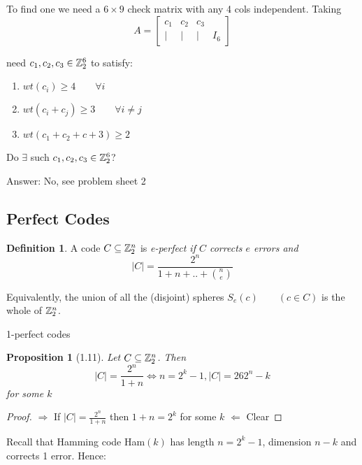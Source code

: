 \documentclass[]{article}
\newtheorem{prop}[thm]{Proposition}
\theoremstyle{definition}
\newtheorem*{defn}{Definition}
\theoremstyle{remark}
\numberwithin{equation}{section}
\begin{document}
			To find one we need a $6 \times 9$ check matrix with any 4 cols independent. \newline
			Taking \[
				A = \begin{bmatrix}
					c_1 & c_2 & c_3 \\
					| & | & | & I_6

				\end{bmatrix}
			\]

			need $c_1, c_2, c_3 \in \mathbb{Z}_2^6$ to satisfy: \newline

			\begin{enumerate}
				\item $wt(c_i)\geq 4 \qquad \forall i$
				\item $wt(c_i + c_j) \geq 3 \qquad \forall i\neq j$
				\item $wt(c_1 + c_2 + c+3) \geq 2$
			\end{enumerate}

			Do $\exists$ such $c_1, c_2, c_3 \in \mathbb{Z}_2^6$?

			Answer: No, see problem sheet 2
	\subsection{Perfect Codes}
		\begin{defn}
			A code $C \subseteq \mathbb{Z}_2^n$ is  \em{e-perfect} if $C$ corrects $e$ errors and \newline
			\[
			|C| = \frac{2^n}{1 + n + .. + \binom{n}{e}}
			\]

			Equivalently, the union of all the (disjoint) spheres $S_e(c)\qquad (c\in C)$ is the whole of $\mathbb{Z}_2^n$.
		\end{defn}

		1-perfect codes

		\begin{prop}[1.11]
			Let $C \subseteq \mathbb{Z}_2^n$. Then \newline
			\[
				|C| = \frac{2^n}{1+n} \iff n=2^k-1, |C| =26 2^n-k
			\]
			for some $k$
		\end{prop}

		\begin{proof}

			$\Rightarrow$ \newline
			If $|C| = \frac{2^n}{1+n}$ then $1 +n = 2^k$ for some $k$ \newline
			$\Leftarrow$ Clear
		\end{proof}

		Recall that Hamming code Ham$(k)$ has length $n= 2^k-1$, dimension $n-k$ and corrects 1 error. Hence: \newline
\end{document}

